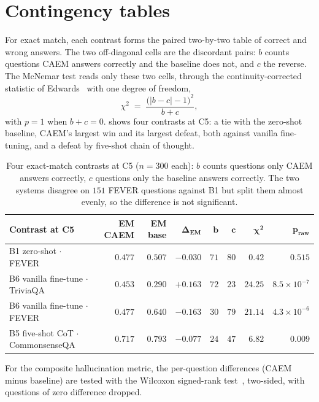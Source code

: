 \section{Contingency tables}
\label{app:sig-tables}

For exact match, each contrast forms the paired two-by-two table of correct and wrong answers. The two off-diagonal cells are the discordant pairs: $b$ counts questions CAEM answers correctly and the baseline does not, and $c$ the reverse. The McNemar test reads only these two cells, through the continuity-corrected statistic of Edwards~\cite{edwards1948note} with one degree of freedom,
\[
\chi^{2} \;=\; \frac{\bigl(\lvert b - c \rvert - 1\bigr)^{2}}{b + c},
\]
with $p = 1$ when $b + c = 0$.  shows four contrasts at C5: a tie with the zero-shot baseline, CAEM's largest win and its largest defeat, both against vanilla fine-tuning, and a defeat by five-shot chain of thought.

\begin{table}[H]
\centering\footnotesize
\setlength{\tabcolsep}{3pt}
\begin{tabular}{@{}lrrrrrrr@{}}
\toprule
\textbf{Contrast at C5} & \textbf{EM CAEM} & \textbf{EM base} & $\boldsymbol{\Delta_{\text{EM}}}$ & $\boldsymbol{b}$ & $\boldsymbol{c}$ & $\boldsymbol{\chi^{2}}$ & $\boldsymbol{p_{\text{raw}}}$ \\
\midrule
B1 zero-shot $\cdot$ FEVER & $0.477$ & $0.507$ & $-0.030$ & $71$ & $80$ & $0.42$ & $0.515$ \\
B6 vanilla fine-tune $\cdot$ TriviaQA & $0.453$ & $0.290$ & $+0.163$ & $72$ & $23$ & $24.25$ & $8.5 \times 10^{-7}$ \\
B6 vanilla fine-tune $\cdot$ FEVER & $0.477$ & $0.640$ & $-0.163$ & $30$ & $79$ & $21.14$ & $4.3 \times 10^{-6}$ \\
B5 five-shot CoT $\cdot$ CommonsenseQA & $0.717$ & $0.793$ & $-0.077$ & $24$ & $47$ & $6.82$ & $0.009$ \\
\bottomrule
\end{tabular}
\caption[Four McNemar contrasts at C5.]{Four exact-match contrasts at C5 ($n = 300$ each): $b$ counts questions only CAEM answers correctly, $c$ questions only the baseline answers correctly. The two systems disagree on $151$ FEVER questions against B1 but split them almost evenly, so the difference is not significant.}
\label{tab:app-sig-tables}
\end{table}

For the composite hallucination metric, the per-question differences (CAEM minus baseline) are tested with the Wilcoxon signed-rank test~\cite{wilcoxon1945individual}, two-sided, with questions of zero difference dropped.

